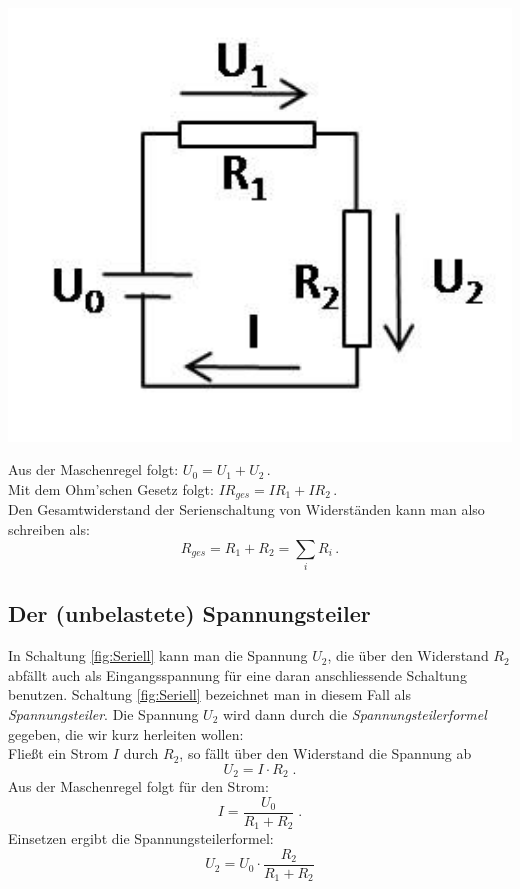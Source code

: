 \begin{minipage}{0.35\textwidth}
 \includegraphics[width=1.00\textwidth]{Versuch_13-14/Abbildungen/Seriell.jpg}
 \label{fig:Seriell}
\end{minipage}
%
\begin{minipage}{0.6\textwidth}
Aus der Maschenregel folgt: \hfill $U_0 = U_1 + U_2\, .$\\
Mit dem Ohm'schen Gesetz folgt: \hfill $I R_{ges} = I R_1 + I R_2\, .$\\
Den Gesamtwiderstand der Serienschaltung von Widerständen kann man also schreiben als: 
\begin{equation}
R_{ges} = R_1 + R_2 = \sum_i{R_i} \, .
\end{equation}
\end{minipage}
%
\subsection{Der (unbelastete) Spannungsteiler}

In Schaltung \ref{fig:Seriell} kann man die Spannung $U_2$, die über den Widerstand $R_2$ abfällt auch als Eingangsspannung für eine daran anschliessende Schaltung benutzen. Schaltung \ref{fig:Seriell} bezeichnet man in diesem Fall als \textit{Spannungsteiler}. Die Spannung $U_2$ wird dann durch die \textit{Spannungsteilerformel} gegeben, die wir kurz herleiten wollen:\\
Fließt ein Strom $I$ durch $R_2$, so fällt über den Widerstand die Spannung ab
\begin{equation*}
U_2 = I\cdot R_2\; .
\end{equation*}
Aus der Maschenregel folgt für den Strom:
\begin{equation*}
I = \frac{U_0}{R_1 + R_2} \; .
\end{equation*}
Einsetzen ergibt die Spannungsteilerformel:
\begin{equation}
U_2 = U_0\cdot\frac{R_2}{R_1+R_2}
\end{equation}

